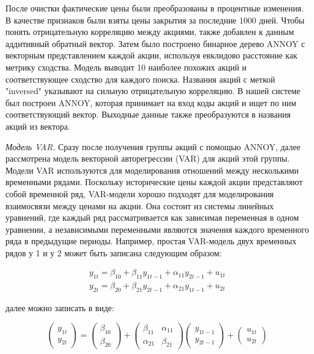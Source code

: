 \begin{multicols}{2}
После очистки фактические цены были преобразованы в процентные
изменения. В качестве признаков были взяты цены закрытия за последние
1000 дней. Чтобы понять отрицательную корреляцию между акциями, также
добавлен к данным аддитивный обратный вектор. Затем было построено
бинарное дерево ANNOY с векторным представлением каждой акции, используя
евклидово расстояние как метрику сходства. Модель выводит 10 наиболее
похожих акций и соответствующее сходство для каждого поиска. Названия
акций с меткой "inversed" указывают на сильную отрицательную корреляцию.
В нашей системе был построен ANNOY, которая принимает на вход коды акций
и ищет по ним соответствующий вектор. Выходные данные также
преобразуются в названия акций из вектора.

\emph{Модель VAR.} Сразу после получения группы акций с помощью ANNOY,
далее рассмотрена модель векторной авторегрессии (VAR) для акций этой
группы. Модели VAR используются для моделирования отношений между
несколькими временными рядами. Поскольку исторические цены каждой акции
представляют собой временной ряд, VAR-модели хорошо подходят для
моделирования взаимосвязи между ценами на акции. Она состоит из системы
линейных уравнений, где каждый ряд рассматривается как зависимая
переменная в одном уравнении, а независимыми переменными являются
значения каждого временного ряда в предыдущие периоды. Например, простая
VAR-модель двух временных рядов у 1 и у 2 может быть записана следующим
образом:
\end{multicols}

\begin{equation}
\begin{matrix}
y_{1t} = \beta_{10} + \beta_{11}y_{1t - 1} + \alpha_{11}y_{2t - 1} + u_{1t} \\
y_{2t} = \beta_{20} + \beta_{21}y_{2t - 1} + \alpha_{21}y_{1t - 1} + u_{2t}
\end{matrix}
\end{equation}

далее можно записать в виде:

\begin{equation}
\left( \begin{array}{r}
y_{1t} \\
y_{2t}
\end{array} \right) = \left( \begin{array}{r}
\beta_{10} \\
\beta_{20}
\end{array} \right) + \begin{pmatrix}
\beta_{11} & \alpha_{11} \\
\alpha_{21} & \beta_{21}
\end{pmatrix}\left( \begin{array}{r}
y_{1t - 1} \\
y_{2t - 1}
\end{array} \right) + \left( \begin{array}{r}
u_{1t} \\
u_{2t}
\end{array} \right)
\end{equation}

